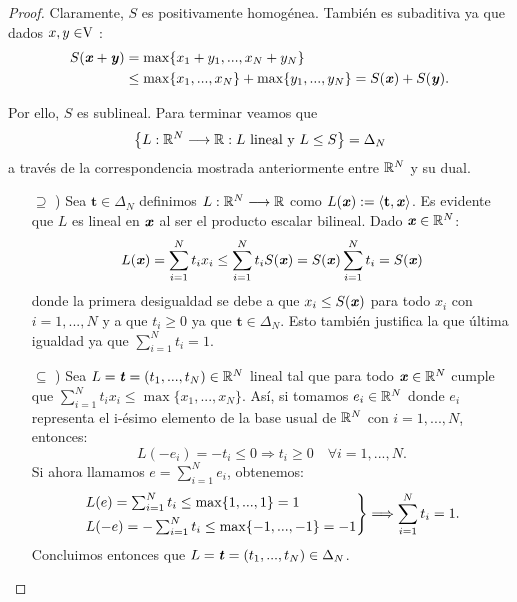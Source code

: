 	\begin{proof}
		Claramente, $ S $ es positivamente homogénea. También es subaditiva ya que dados $ x,y \in \vecSpace $ : 
		\begin{equation*}
		\begin{split}
		S(\textbf{\emph{x}}+\textbf{\emph{y}}) &= \max \{x_1 + y_1, ..., x_N +y_N \}\\ 
		&\leq \max\{x_1, ..., x_N\} + \max \{y_1, ...,y_N\} = S(\textbf{\emph{x}}) + S(\textbf{\emph{y}}).
		\end{split}
		\end{equation*}
		
		Por ello, $ S $ es sublineal. Para terminar veamos que  \[\left\lbrace L:\mathbb{R}^N \longrightarrow \mathbb{R} : L \text{ lineal y }L\leq S \right\rbrace  =  \Delta_N \]
		 a través de la correspondencia mostrada anteriormente entre $ \mathbb{R}^N $ y su dual.
		
		\begin{itemize}
			\item[$ \supseteq $ )] Sea $ \mathbf{t} \in \Delta_N$ definimos $ L:\mathbb{R}^N \longrightarrow \mathbb{R} $ como $ L(\textbf{\emph{x}}):= \langle \mathbf{t},\textbf{\emph{x}} \rangle $. Es evidente que $ L $ es lineal en $ \textbf{\emph{x}} $ al ser el producto escalar bilineal. Dado $ \textbf{\emph{x}} \in \mathbb{R}^N $:
			\begin{equation*}
				L(\textbf{\emph{x}}) = \sum_{i=1}^{N}{t_i x_i} \leq \sum_{i=1}^{N}{t_i S(\textbf{\emph{x}})} = S(\textbf{\emph{x}})\sum_{i=1}^{N}{t_i} = S(\textbf{\emph{x}})
			\end{equation*}
			donde la primera desigualdad se debe a que $ x_i \leq S(\textbf{\emph{x}})$ para todo $ x_i$ con $ i=1,...,N $ y a que $ t_i \geq 0 $ ya que $ \mathbf{t} \in \Delta_N$. Esto también justifica la que última igualdad ya que $ \sum_{i=1}^{N}{t_i} = 1 $.
			
			\item[$ \subseteq $ )] Sea $ L = \textbf{\emph{t}} = (t_1,...,t_N) \in \mathbb{R}^N $ lineal tal que para todo $ \textbf{\emph{x}} \in \mathbb{R}^N $ cumple que $ \sum_{i=1}^{N}{t_i x_i} \leq \max\{x_1,...,x_N\}$. Así, si tomamos $ e_i \in \mathbb{R}^N $ donde $ e_i $ representa el i-ésimo elemento de la base usual de $ \mathbb{R}^N $ con $ i=1,...,N $, entonces:   		
			\begin{equation*}
				L(-e_i) = -t_i \leq 0 \Longrightarrow t_i \geq 0 \quad \forall i=1,...,N.
			\end{equation*}
			Si ahora llamamos $ e = \sum_{i=1}^{N}{e_i} $, obtenemos:
			\begin{equation*}
				\begin{rcases*}
				L(e) = \sum_{i=1}^{N}{t_i} \leq \max \{1, ...,1\} = 1 \\
				L(-e) = -\sum_{i=1}^{N}{t_i} \leq \max \{-1, ...,-1\} = -1
				\end{rcases*} \Longrightarrow \sum_{i=1}^{N}{t_i} = 1.
			\end{equation*}
			Concluimos entonces que $ L = \textbf{\emph{t}} = (t_1,...,t_N) \in \Delta_N $.
		\end{itemize}
		
	\end{proof}


